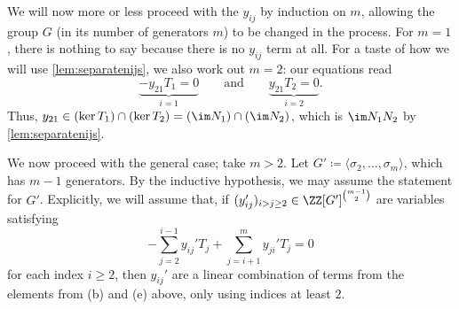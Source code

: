 We will now more or less proceed with the $y_{ij}$ by induction on $m$, allowing the group $G$ (in its number of generators $m$) to be changed in the process. For $m=1$, there is nothing to say because there is no $y_{ij}$ term at all. For a taste of how we will use \autoref{lem:separatenijs}, we also work out $m=2$: our equations read
\[\underbrace{-y_{21}T_1=0}_{i=1}\qquad\text{and}\qquad\underbrace{y_{21}T_2=0}_{i=2}.\]
Thus, $y_{21}\in(\ker T_1)\cap(\ker T_2)=(\im N_1)\cap(\im N_2)$, which is $\im N_1N_2$ by \autoref{lem:separatenijs}.

We now proceed with the general case; take $m>2$. Let $G'\coloneqq\langle\sigma_2,\ldots,\sigma_m\rangle$, which has $m-1$ generators. By the inductive hypothesis, we may assume the statement for $G'$. Explicitly, we will assume that, if $(y_{ij}')_{i>j\ge2}\in\ZZ[G']^{\binom{m-1}2}$ are variables satisfying
\[-\sum_{j=2}^{i-1}y_{ij}'T_j+\sum_{j=i+1}^my_{ji}'T_j=0\]
for each index $i\ge2$, then $y_{ij}'$ are a linear combination of terms from the elements from (b) and (e) above, only using indices at least $2$.

